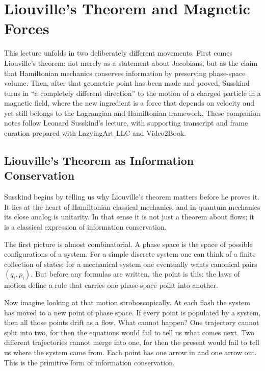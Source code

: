 \chapter{Liouville's Theorem and Magnetic Forces}

This lecture unfolds in two deliberately different movements. First comes Liouville's theorem: not merely as a statement about Jacobians, but as the claim that Hamiltonian mechanics conserves information by preserving phase-space volume. Then, after that geometric point has been made and proved, Susskind turns in ``a completely different direction'' to the motion of a charged particle in a magnetic field, where the new ingredient is a force that depends on velocity and yet still belongs to the Lagrangian and Hamiltonian framework. These companion notes follow Leonard Susskind's lecture, with supporting transcript and frame curation prepared with LazyingArt LLC and Video2Book.

\section{Liouville's Theorem as Information Conservation}

Susskind begins by telling us why Liouville's theorem matters before he proves it. It lies at the heart of Hamiltonian classical mechanics, and in quantum mechanics its close analog is unitarity. In that sense it is not just a theorem about flows; it is a classical expression of information conservation.

The first picture is almost combinatorial. A phase space is the space of possible configurations of a system. For a simple discrete system one can think of a finite collection of states; for a mechanical system one eventually wants canonical pairs \((q_i,p_i)\). But before any formulas are written, the point is this: the laws of motion define a rule that carries one phase-space point into another.

Now imagine looking at that motion stroboscopically. At each flash the system has moved to a new point of phase space. If every point is populated by a system, then all those points drift as a flow. What cannot happen? One trajectory cannot split into two, for then the equations would fail to tell us what comes next. Two different trajectories cannot merge into one, for then the present would fail to tell us where the system came from. Each point has one arrow in and one arrow out. This is the primitive form of information conservation.


